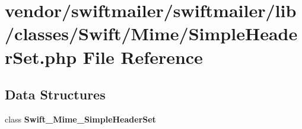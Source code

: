 \section{vendor/swiftmailer/swiftmailer/lib/classes/\+Swift/\+Mime/\+Simple\+Header\+Set.php File Reference}
\label{_simple_header_set_8php}
\subsection*{Data Structures}
\begin{DoxyCompactItemize}
\item 
class {\bf Swift\+\_\+\+Mime\+\_\+\+Simple\+Header\+Set}
\end{DoxyCompactItemize}

